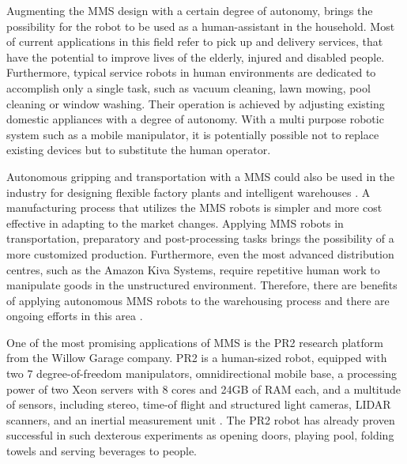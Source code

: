 Augmenting the MMS design with a certain degree of autonomy, brings the possibility for the robot to be used as a human-assistant in the household. Most of current applications in this field refer to pick up and delivery services, that have the potential to improve lives of the elderly, injured and disabled people. Furthermore, typical service robots in human environments are dedicated to accomplish only a single task, such as vacuum cleaning, lawn mowing, pool cleaning or window washing. Their operation is achieved by adjusting existing domestic appliances with a degree of autonomy. With a multi purpose robotic system such as a mobile manipulator, it is potentially possible not to replace existing devices but to substitute the human operator. 

Autonomous gripping and transportation with a MMS could also be used in the industry for designing flexible factory plants and intelligent warehouses \cite{aimm}. A manufacturing process that utilizes the MMS robots is simpler and more cost effective in adapting to the market changes. Applying MMS robots in transportation, preparatory and post-processing tasks brings the possibility of a more customized production. Furthermore, even the most advanced distribution centres, such as the Amazon Kiva Systems, require repetitive human work to manipulate goods in the unstructured environment. Therefore, there are benefits of applying autonomous MMS robots to the warehousing process and there are ongoing efforts in this area \cite{amazonchallenge}.


One of the most promising applications of MMS is the PR2 research platform from the Willow Garage company. PR2 is a human-sized robot, equipped with two 7 degree-of-freedom manipulators, omnidirectional mobile base, a processing power of two Xeon servers with 8 cores and 24GB of RAM each, and a multitude of sensors, including stereo, time-of flight and structured light cameras, LIDAR scanners, and an inertial measurement unit \cite{prspecs}. The PR2 robot has already proven successful in such dexterous experiments as opening doors, playing pool, folding towels and serving beverages to people. 

